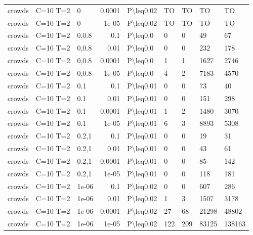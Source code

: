 \begin{longtable}{lllrlllll}
 crowds        & C=10 T=2  & 0     & 0.0001 & P\textbackslash{}leq0.02  & TO   & TO   & TO       & TO      \\
 crowds        & C=10 T=2  & 0     & 1e-05  & P\textbackslash{}leq0.02  & TO   & TO   & TO       & TO      \\
 crowds        & C=10 T=2  & 0,0.8 & 0.1    & P\textbackslash{}leq0.0   & 0    & 0    & 49       & 67      \\
 crowds        & C=10 T=2  & 0,0.8 & 0.01   & P\textbackslash{}leq0.0   & 0    & 0    & 232      & 178     \\
 crowds        & C=10 T=2  & 0,0.8 & 0.0001 & P\textbackslash{}leq0.0   & 1    & 1    & 1627     & 2746    \\
 crowds        & C=10 T=2  & 0,0.8 & 1e-05  & P\textbackslash{}leq0.0   & 4    & 2    & 7183     & 4570    \\
 crowds        & C=10 T=2  & 0.1   & 0.1    & P\textbackslash{}leq0.01  & 0    & 0    & 73       & 40      \\
 crowds        & C=10 T=2  & 0.1   & 0.01   & P\textbackslash{}leq0.01  & 0    & 0    & 151      & 298     \\
 crowds        & C=10 T=2  & 0.1   & 0.0001 & P\textbackslash{}leq0.01  & 1    & 2    & 1480     & 3070    \\
 crowds        & C=10 T=2  & 0.1   & 1e-05  & P\textbackslash{}leq0.01  & 6    & 3    & 8893     & 5308    \\
 crowds        & C=10 T=2  & 0.2,1 & 0.1    & P\textbackslash{}leq0.01  & 0    & 0    & 19       & 31      \\
 crowds        & C=10 T=2  & 0.2,1 & 0.01   & P\textbackslash{}leq0.01  & 0    & 0    & 43       & 61      \\
 crowds        & C=10 T=2  & 0.2,1 & 0.0001 & P\textbackslash{}leq0.01  & 0    & 0    & 85       & 142     \\
 crowds        & C=10 T=2  & 0.2,1 & 1e-05  & P\textbackslash{}leq0.01  & 0    & 0    & 118      & 181     \\
 crowds        & C=10 T=2  & 1e-06 & 0.1    & P\textbackslash{}leq0.02  & 0    & 0    & 607      & 286     \\
 crowds        & C=10 T=2  & 1e-06 & 0.01   & P\textbackslash{}leq0.02  & 1    & 3    & 1507     & 3178    \\
 crowds        & C=10 T=2  & 1e-06 & 0.0001 & P\textbackslash{}leq0.02  & 27   & 68   & 21298    & 48802   \\
 crowds        & C=10 T=2  & 1e-06 & 1e-05  & P\textbackslash{}leq0.02  & 122  & 209  & 83125    & 138163  \\

\end{longtable}
